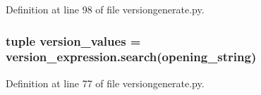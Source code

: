 \-Definition at line 98 of file versiongenerate.\-py.

\hypertarget{namespaceversiongenerate_a35eb88dbd6495135f918fcd2966afe32}{
\subsubsection[{version\-\_\-values}]{\setlength{\rightskip}{0pt plus 5cm}tuple {\bf version\-\_\-values} = version\-\_\-expression.\-search({\bf opening\-\_\-string})}}\label{d3/d03/namespaceversiongenerate_a35eb88dbd6495135f918fcd2966afe32}


\-Definition at line 77 of file versiongenerate.\-py.

